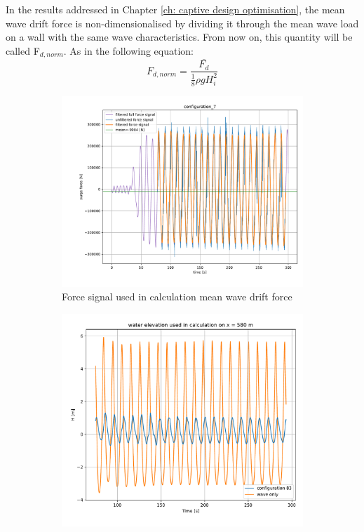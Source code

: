 In the results addressed in Chapter \ref{ch: captive design optimisation}, the mean wave drift force is non-dimensionalised by dividing it through the mean wave load on a wall with the same wave characteristics. From now on, this quantity will be called F$_{d,norm}$. As in the following equation:
\begin{equation}
    F_{d,norm} = \frac{\bar{F_d}}{\frac{1}{8}\rho g H_i^2}
    \label{eq: handling Fdnorm}
\end{equation}



\begin{figure}[H]
     \centering
     \begin{subfigure}[b]{0.49\textwidth}
         \centering
         \includegraphics[width=\textwidth]{figures/Methodology/calculation_Fd_mean_methodology.pdf}
        \caption{Force signal used in calculation mean wave drift force}
        \label{fig: methodology Fd calculation}
     \end{subfigure}
     \hfill
     \begin{subfigure}[b]{0.49\textwidth}
         \centering
        \includegraphics[width = \linewidth]{figures/Methodology/calculation_H_t_methodology.pdf}

\end{subfigure}
\end{figure}
